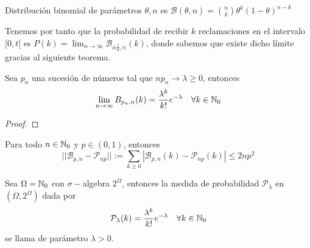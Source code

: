 \begin{ejemplo}
\end{ejemplo}

\begin{observacion}
    Distribución binomial de parámetros $\theta, n$ es $\mathcal{B}(\theta, n)=\binom{n}{k} \theta^k (1-\theta)^{n-k}$
\end{observacion}
\noindent
Tenemos por tanto que la probabilidad de recibir $k$ reclamaciones en el intervalo $[0,t[$ es $P(k)=\lim_{n\to \infty} \mathcal{B}_{\alpha \frac{t}{n}, n}(k)$, donde sabemos que existe dicho límite gracias al siguiente teorema.

\begin{teo}
    Sea ${p_n}$ una sucesión de números tal que $np_n\to \lambda\geq 0$, entonces
    \begin{equation*}
        \lim_{n\to \infty}B_{p_n,n}(k)=\dfrac{\lambda^k}{k!}e^{-\lambda} \quad \forall k\in \mathbb{N}_0
    \end{equation*}
    \begin{proof}
    \end{proof}
\end{teo}

\begin{teo}
    Para todo $n\in \mathbb{N}_0$ y $p \in(0,1)$, entonces
    \begin{equation*}
        || \mathcal{B}_{p,n} - \mathcal{P}_{np} || := \sum_{k\geq 0} | \mathcal{B}_{p,n}(k) - \mathcal{P}_{np}(k) | \leq 2np^2
    \end{equation*}
\end{teo}

\begin{definicion}
    Sea $\Omega=\mathbb{N}_0$ con $\sigma-$algebra $2^{\Omega}$, entonces la medida de probabilidad $\mathcal{P}_{\lambda}$ en $(\Omega, 2^{\Omega})$ dada por
    \begin{equation*}
        \mathcal{P}_{\lambda}(k) = \dfrac{\lambda^k}{k!} e^{-\lambda} \quad \forall k\in \mathbb{N}_0
    \end{equation*}
    se llama  de parámetro $\lambda>0$.
\end{definicion}

\begin{ejemplo}
\end{ejemplo}

